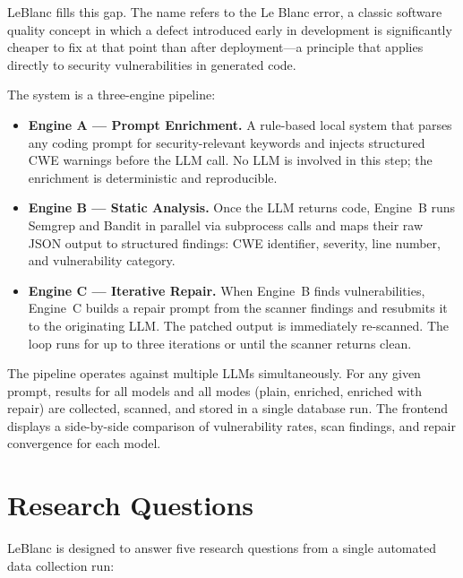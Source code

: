 \documentclass[12pt,a4paper]{report}
\begin{document}
LeBlanc fills this gap. The name refers to the Le Blanc error, a classic
software quality concept in which a defect introduced early in development is
significantly cheaper to fix at that point than after deployment---a principle
that applies directly to security vulnerabilities in generated code.

The system is a three-engine pipeline:

\begin{itemize}
  \item \textbf{Engine A --- Prompt Enrichment.} A rule-based local system that
        parses any coding prompt for security-relevant keywords and injects
        structured CWE warnings before the LLM call. No LLM is involved in this
        step; the enrichment is deterministic and reproducible.

  \item \textbf{Engine B --- Static Analysis.} Once the LLM returns code,
        Engine~B runs Semgrep and Bandit in parallel via subprocess calls and
        maps their raw JSON output to structured findings: CWE identifier,
        severity, line number, and vulnerability category.

  \item \textbf{Engine C --- Iterative Repair.} When Engine~B finds
        vulnerabilities, Engine~C builds a repair prompt from the scanner
        findings and resubmits it to the originating LLM. The patched output is
        immediately re-scanned. The loop runs for up to three iterations or until
        the scanner returns clean.
\end{itemize}

The pipeline operates against multiple LLMs simultaneously. For any given prompt,
results for all models and all modes (plain, enriched, enriched with repair) are
collected, scanned, and stored in a single database run. The frontend displays
a side-by-side comparison of vulnerability rates, scan findings, and repair
convergence for each model.

\section{Research Questions}
\label{sec:rqs}

LeBlanc is designed to answer five research questions from a single automated
data collection run:
\end{document}
